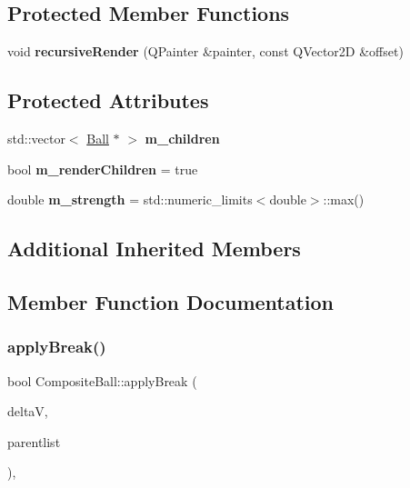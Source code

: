\subsection*{Protected Member Functions}
\begin{DoxyCompactItemize}
\item 
\mbox{\label{class_composite_ball_a05f96cd1c4321d89763dce5a15b53138}} 
void {\bfseries recursive\+Render} (Q\+Painter \&painter, const Q\+Vector2D \&offset)
\end{DoxyCompactItemize}
\subsection*{Protected Attributes}
\begin{DoxyCompactItemize}
\item 
\mbox{\label{class_composite_ball_a2689ad5361a52d586f43dafd8922a422}} 
std\+::vector$<$ \mbox{\hyperlink{class_ball}{Ball}} $\ast$ $>$ {\bfseries m\+\_\+children}
\item 
\mbox{\label{class_composite_ball_a751e10b0f9278bcf48720ac6af9bdd20}} 
bool {\bfseries m\+\_\+render\+Children} = true
\item 
\mbox{\label{class_composite_ball_a78051a7a01a600b88ed22e7d725640db}} 
double {\bfseries m\+\_\+strength} = std\+::numeric\+\_\+limits$<$double$>$\+::max()
\end{DoxyCompactItemize}
\subsection*{Additional Inherited Members}


\subsection{Member Function Documentation}
\mbox{\label{class_composite_ball_a0da2c5749caafcef943f14a500a0fc9b}} 
\subsubsection{\texorpdfstring{apply\+Break()}{applyBreak()}}
{\footnotesize\ttfamily bool Composite\+Ball\+::apply\+Break (\begin{DoxyParamCaption}\item[{const Q\+Vector2D \&}]{deltaV,  }\item[{std\+::vector$<$ \mbox{\hyperlink{class_ball}{Ball}} $\ast$$>$ \&}]{parentlist }\end{DoxyParamCaption})\hspace{0.3cm}{\ttfamily [override]}, {\ttfamily [virtual]}}



